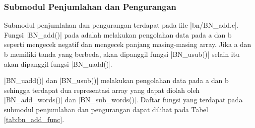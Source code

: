     \subsubsection{Submodul Penjumlahan dan Pengurangan}
      Submodul penjumlahan dan pengurangan terdapat pada file |bn/BN_add.c|. Fungsi |BN_add()| pada adalah melakukan pengolahan data pada a dan b seperti mengecek negatif dan mengecek panjang masing-masing array. Jika a dan b memiliki tanda yang berbeda, akan dipanggil fungsi |BN_usub()| selain itu akan dipanggil fungsi |BN_uadd()|.

      |BN\_uadd()| dan |BN_usub()| melakukan pengolahan data pada a dan b sehingga terdapat dua representasi array yang dapat diolah oleh |BN_add_words()| dan |BN_sub_words()|. Daftar fungsi yang terdapat pada submodul penjumlahan dan pengurangan dapat dilihat pada Tabel \ref{tab:bn_add_func}.

